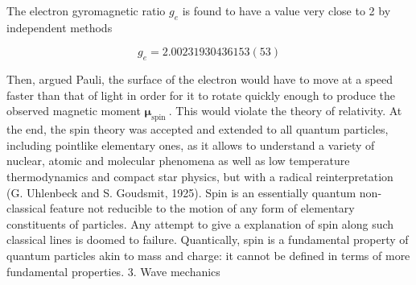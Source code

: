 \documentclass{article}
\begin{document}
The electron gyromagnetic ratio $g_{e}$ is found to have a value very close to 2 by independent methods
 
\begin{equation*}
g_{e}=2.00231930436153(53) \tag{2.10.25}
\end{equation*}
 

Then, argued Pauli, the surface of the electron would have to move at a speed faster than that of light in order for it to rotate quickly enough to produce the observed magnetic moment $\boldsymbol{\mu}_{\text {spin }}$. This would violate the theory of relativity. At the end, the spin theory was accepted and extended to all quantum particles, including pointlike elementary ones, as it allows to understand a variety of nuclear, atomic and molecular phenomena as well as low temperature thermodynamics and compact star physics, but with a radical reinterpretation (G. Uhlenbeck and S. Goudsmit, 1925). Spin is an essentially quantum non-classical feature not reducible to the motion of any form of elementary constituents of particles. Any attempt to give a explanation of spin along such classical lines is doomed to failure. Quantically,
spin is a fundamental property of quantum particles akin to mass and charge: it cannot be defined in terms of more fundamental properties.
3. Wave mechanics
\end{document}
